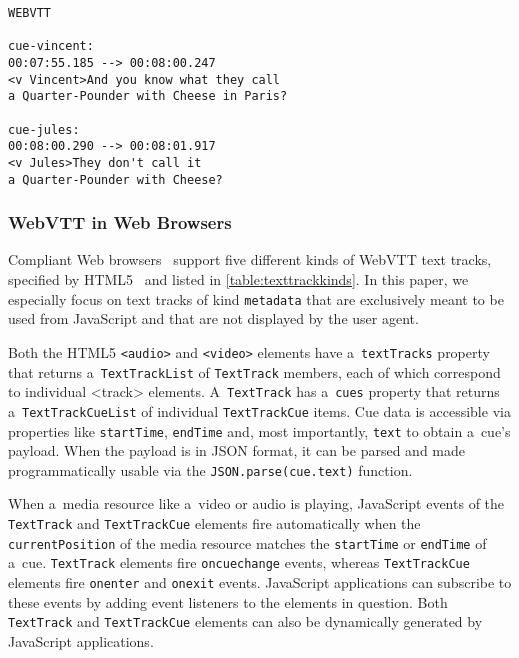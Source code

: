 \documentclass{sig-alternate}
\begin{document}
\begin{lstlisting}[caption={Sample WebVTT file with two cues
    with the IDs \texttt{cue-vincent} and
    \texttt{cue-jules} respectively},
  label=listing:webvtt, float=h!]
WEBVTT

cue-vincent:
00:07:55.185 --> 00:08:00.247
<v Vincent>And you know what they call
a Quarter-Pounder with Cheese in Paris?

cue-jules:
00:08:00.290 --> 00:08:01.917
<v Jules>They don't call it
a Quarter-Pounder with Cheese?
\end{lstlisting}

\subsubsection{WebVTT in Web Browsers}

Compliant Web browsers~\cite{dutton2012trackelement}
support five different kinds of
WebVTT text tracks, specified by HTML5~\cite{berjon2013html5}
and listed in \autoref{table:texttrackkinds}.
In this paper, we especially focus on
text tracks of kind \texttt{metadata}
that are exclusively meant to be used from JavaScript and
that are not displayed by the user agent.

Both the HTML5 \texttt{<audio>} and \texttt{<video>} elements
have a~\texttt{textTracks} property
that returns a~\texttt{TextTrackList} of
\texttt{TextTrack} members, each of which correspond
to individual <track> elements.
A~\texttt{TextTrack} has a~\texttt{cues} property
that returns a~\texttt{TextTrackCueList} of individual
\texttt{TextTrackCue} items.
Cue data is accessible via properties like
\texttt{startTime}, \texttt{endTime} and,
most importantly, \texttt{text} to obtain a~cue's payload.
When the payload is in JSON format,
it can be parsed and made programmatically usable via the
\texttt{JSON.parse(cue.text)} function.

When a~media resource like a~video or audio is playing,
JavaScript events of the \texttt{TextTrack} and \texttt{TextTrackCue}
elements fire automatically when the \texttt{currentPosition}
of the media resource matches the
\texttt{startTime} or \texttt{endTime} of a~cue.
\texttt{TextTrack} elements fire \texttt{oncuechange} events,
whereas \texttt{TextTrackCue} elements fire
\texttt{onenter} and \texttt{onexit} events.
JavaScript applications can subscribe to these events
by adding event listeners to the elements in question.
Both \texttt{TextTrack} and \texttt{TextTrackCue} elements
can also be dynamically generated by JavaScript applications.
\end{document}
